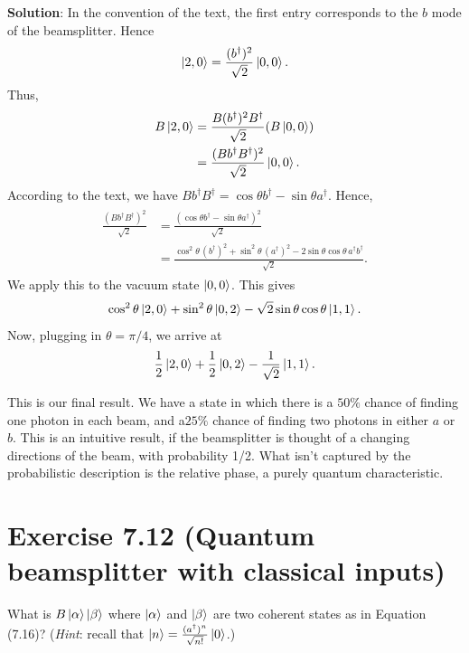 \documentclass{book}
\begin{document}
    \textbf{Solution}: In the convention of the text, the first entry corresponds to the $b$ mode of the beamsplitter. Hence
    \begin{align}
        \ket{2,0} = \frac{(b^\dagger)^2}{\sqrt{2}} \ket{0,0}.
    \end{align}
    Thus,
    \begin{align}
    \begin{aligned}
        B\ket{2,0} &= \frac{B (b^\dagger)^2 B^
        \dagger}{\sqrt{2}} (B \ket{0,0}) \\
        &= \frac{(B b^\dagger B^\dagger)^2}{\sqrt{2}} \ket{0,0}.
    \end{aligned}
    \end{align}
    According to the text, we have $B b^\dagger B^\dagger = \cos \theta b^\dagger - \sin\theta a^\dagger$. Hence,
    \begin{align}
    \begin{aligned}
        \frac{(Bb^\dagger B^\dagger)^2}{\sqrt{2}} &= \frac{(\cos \theta b^\dagger - \sin\theta a^\dagger)^2}{\sqrt{2}} \\
        &= \frac{\cos^2 \theta\, (b^\dagger)^2 + \sin^2 \theta\,(a^\dagger)^2 - 2 \sin\theta \cos\theta\, a^\dagger b^\dagger}{\sqrt{2}}.
    \end{aligned}
    \end{align}
    We apply this to the vacuum state $\ket{0,0}$. This gives
    \begin{align}
        \cos^2 \theta \ket{2,0} + \sin^2 \theta \ket{0,2} - \sqrt{2} \sin\theta \cos\theta \ket{1,1}.
    \end{align}
    Now, plugging in $\theta = \pi/4$, we arrive at 
    \begin{align}
        \frac{1}{2}\ket{2,0} + \frac{1}{2} \ket{0,2} - \frac{1}{\sqrt{2}} \ket{1,1}.
    \end{align}
    
    This is our final result. We have a state in which there is a $50\%$ chance of finding one photon in each beam, and a$25\%$ chance of finding two photons in either $a$ or $b$. This is an intuitive result, if the beamsplitter is thought of a changing directions of the beam, with probability 1/2. What isn't captured by the probabilistic description is the relative phase, a purely quantum characteristic.

\section*{Exercise 7.12 (Quantum beamsplitter with classical inputs)}
    What is $B\ket{\alpha}\ket{\beta}$ where $\ket{\alpha}$ and $\ket{\beta}$ are two coherent states as in Equation (7.16)? (\emph{Hint}: recall that $\ket{n} = \frac{(a^\dagger)^n}{\sqrt{n!}}\ket{0}$.)
\end{document}
